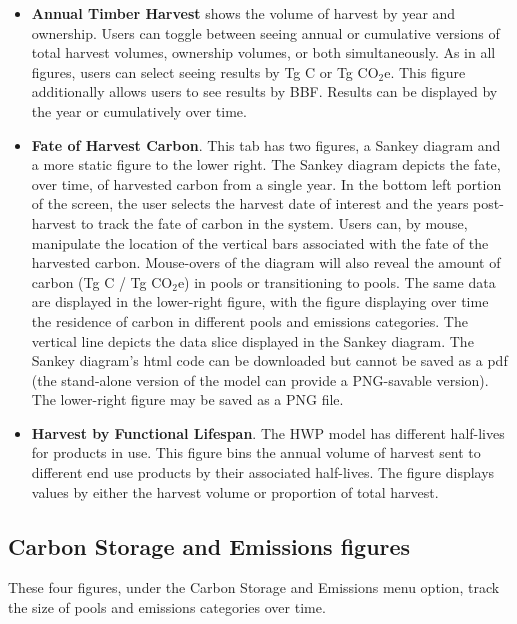 \documentclass[
  openany]{book}
\begin{document}
\begin{itemize}
\item
  \textbf{Annual Timber Harvest} shows the volume of harvest by year and ownership. Users can toggle between seeing annual or cumulative versions of total harvest volumes, ownership volumes, or both simultaneously. As in all figures, users can select seeing results by Tg C or Tg CO\(_2\)e. This figure additionally allows users to see results by BBF. Results can be displayed by the year or cumulatively over time.
\item
  \textbf{Fate of Harvest Carbon}. This tab has two figures, a Sankey diagram and a more static figure to the lower right. The Sankey diagram depicts the fate, over time, of harvested carbon from a single year. In the bottom left portion of the screen, the user selects the harvest date of interest and the years post-harvest to track the fate of carbon in the system. Users can, by mouse, manipulate the location of the vertical bars associated with the fate of the harvested carbon. Mouse-overs of the diagram will also reveal the amount of carbon (Tg C / Tg CO\(_2\)e) in pools or transitioning to pools. The same data are displayed in the lower-right figure, with the figure displaying over time the residence of carbon in different pools and emissions categories. The vertical line depicts the data slice displayed in the Sankey diagram. The Sankey diagram's html code can be downloaded but cannot be saved as a pdf (the stand-alone version of the model can provide a PNG-savable version). The lower-right figure may be saved as a PNG file.
\item
  \textbf{Harvest by Functional Lifespan}. The HWP model has different half-lives for products in use. This figure bins the annual volume of harvest sent to different end use products by their associated half-lives. The figure displays values by either the harvest volume or proportion of total harvest.
\end{itemize}

\hypertarget{app-shiny-cse}{%
\subsection{Carbon Storage and Emissions figures}\label{app-shiny-cse}}

These four figures, under the Carbon Storage and Emissions menu option, track the size of pools and emissions categories over time.
\end{document}
